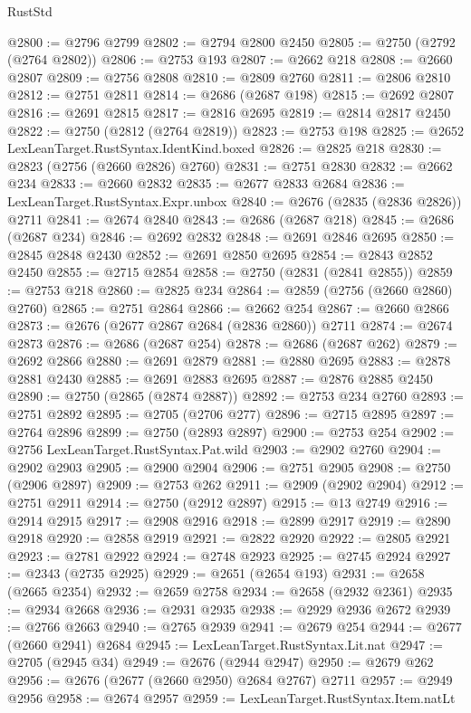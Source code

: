 \begin{lexlean}{RustStd}
\begin{coremodule}
{\begin{coremodule}
{{{{{{{{{{{{{{{{{{{{{{{{{{{{{{{{{{{{{{{{{{{{{{{{{{{{{{{@2800 := @2796 @2799
@2802 := @2794 @2800 @2450
@2805 := @2750 (@2792 (@2764 @2802))
@2806 := @2753 @193
@2807 := @2662 @218
@2808 := @2660 @2807
@2809 := @2756 @2808
@2810 := @2809 @2760
@2811 := @2806 @2810
@2812 := @2751 @2811
@2814 := @2686 (@2687 @198)
@2815 := @2692 @2807
@2816 := @2691 @2815
@2817 := @2816 @2695
@2819 := @2814 @2817 @2450
@2822 := @2750 (@2812 (@2764 @2819))
@2823 := @2753 @198
@2825 := @2652 LexLeanTarget.RustSyntax.IdentKind.boxed
@2826 := @2825 @218
@2830 := @2823 (@2756 (@2660 @2826) @2760)
@2831 := @2751 @2830
@2832 := @2662 @234
@2833 := @2660 @2832
@2835 := @2677 @2833 @2684
@2836 := LexLeanTarget.RustSyntax.Expr.unbox
@2840 := @2676 (@2835 (@2836 @2826)) @2711
@2841 := @2674 @2840
@2843 := @2686 (@2687 @218)
@2845 := @2686 (@2687 @234)
@2846 := @2692 @2832
@2848 := @2691 @2846 @2695
@2850 := @2845 @2848 @2430
@2852 := @2691 @2850 @2695
@2854 := @2843 @2852 @2450
@2855 := @2715 @2854
@2858 := @2750 (@2831 (@2841 @2855))
@2859 := @2753 @218
@2860 := @2825 @234
@2864 := @2859 (@2756 (@2660 @2860) @2760)
@2865 := @2751 @2864
@2866 := @2662 @254
@2867 := @2660 @2866
@2873 := @2676 (@2677 @2867 @2684 (@2836 @2860)) @2711
@2874 := @2674 @2873
@2876 := @2686 (@2687 @254)
@2878 := @2686 (@2687 @262)
@2879 := @2692 @2866
@2880 := @2691 @2879
@2881 := @2880 @2695
@2883 := @2878 @2881 @2430
@2885 := @2691 @2883 @2695
@2887 := @2876 @2885 @2450
@2890 := @2750 (@2865 (@2874 @2887))
@2892 := @2753 @234 @2760
@2893 := @2751 @2892
@2895 := @2705 (@2706 @277)
@2896 := @2715 @2895
@2897 := @2764 @2896
@2899 := @2750 (@2893 @2897)
@2900 := @2753 @254
@2902 := @2756 LexLeanTarget.RustSyntax.Pat.wild
@2903 := @2902 @2760
@2904 := @2902 @2903
@2905 := @2900 @2904
@2906 := @2751 @2905
@2908 := @2750 (@2906 @2897)
@2909 := @2753 @262
@2911 := @2909 (@2902 @2904)
@2912 := @2751 @2911
@2914 := @2750 (@2912 @2897)
@2915 := @13 @2749
@2916 := @2914 @2915
@2917 := @2908 @2916
@2918 := @2899 @2917
@2919 := @2890 @2918
@2920 := @2858 @2919
@2921 := @2822 @2920
@2922 := @2805 @2921
@2923 := @2781 @2922
@2924 := @2748 @2923
@2925 := @2745 @2924
@2927 := @2343 (@2735 @2925)
@2929 := @2651 (@2654 @193)
@2931 := @2658 (@2665 @2354)
@2932 := @2659 @2758
@2934 := @2658 (@2932 @2361)
@2935 := @2934 @2668
@2936 := @2931 @2935
@2938 := @2929 @2936 @2672
@2939 := @2766 @2663
@2940 := @2765 @2939
@2941 := @2679 @254
@2944 := @2677 (@2660 @2941) @2684
@2945 := LexLeanTarget.RustSyntax.Lit.nat
@2947 := @2705 (@2945 @34)
@2949 := @2676 (@2944 @2947)
@2950 := @2679 @262
@2956 := @2676 (@2677 (@2660 @2950) @2684 @2767) @2711
@2957 := @2949 @2956
@2958 := @2674 @2957
@2959 := LexLeanTarget.RustSyntax.Item.natLt
}}}}}}}}}}}}}}}}}}}}}}}}}}}}}}}}}}}}}}}}}}}}}}}}}}}}}}}
\end{coremodule}}
\end{coremodule}
\end{lexlean}
